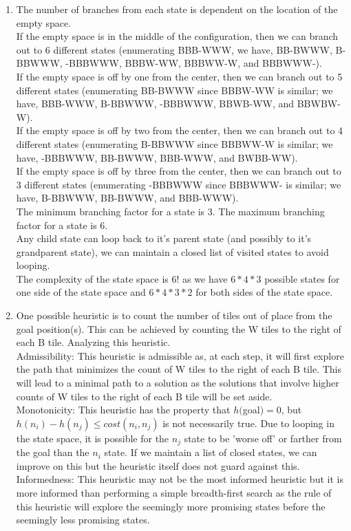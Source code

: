 \documentclass[11pt]{article}
\begin{document}
\begin{enumerate}
	\item The number of branches from each state is dependent on the location of the empty space. 
	\\If the empty space is in the middle of the configuration, then we can branch out to 6 different states (enumerating BBB-WWW, we have, BB-BWWW, B-BBWWW, -BBBWWW, BBBW-WW, BBBWW-W, and BBBWWW-). 
	\\If the empty space is off by one from the center, then we can branch out to 5 different states (enumerating BB-BWWW since BBBW-WW is similar; we have, BBB-WWW, B-BBWWW, -BBBWWW, BBWB-WW, and BBWBW-W). 
	\\If the empty space is off by two from the center, then we can branch out to 4 different states (enumerating B-BBWWW since BBBWW-W is similar; we have, -BBBWWW, BB-BWWW, BBB-WWW, and BWBB-WW). 
	\\If the empty space is off by three from the center, then we can branch out to 3 different states (enumerating -BBBWWW since BBBWWW- is similar; we have, B-BBWWW, BB-BWWW, and BBB-WWW). 
	\\The minimum branching factor for a state is 3. The maximum branching factor for a state is 6. 
	\\Any child state can loop back to it's parent state (and possibly to it's grandparent state), we can maintain a closed list of visited states to avoid looping. 
	\\The complexity of the state space is $6!$ as we have $6*4*3$ possible states for one side of the state space and  $6*4*3*2$ for both sides of the state space.
	\item One possible heuristic is to count the number of tiles out of place from the goal position(s). This can be achieved by counting the W tiles to the right of each B tile. Analyzing this heuristic.
	\\Admissibility: This heuristic is admissible as, at each step, it will first explore the path that minimizes the count of W tiles to the right of each B tile. This will lead to a minimal path to a solution as the solutions that involve higher counts of W tiles to the right of each B tile will be set aside.
	\\Monotonicity: This heuristic has the property that $h($goal$) = 0$, but $h(n_i) - h(n_j) \leq cost(n_i, n_j)$ is not necessarily true. Due to looping in the state space, it is possible for the $n_j$ state to be 'worse off' or farther from the goal than the $n_i$ state. If we maintain a list of closed states, we can improve on this but the heuristic itself does not guard against this. 
	\\Informedness: This heuristic may not be the most informed heuristic but it is more informed than performing a simple breadth-first search as the rule of this heuristic will explore the seemingly more promising states before the seemingly less promising states.
\end{enumerate}
 
\end{document}
